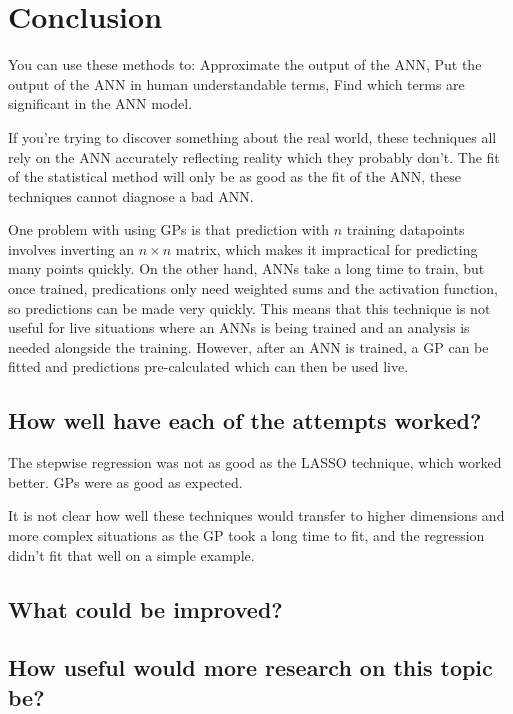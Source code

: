 
\chapter{Conclusion}

You can use these methods to:
Approximate the output of the \ac{ANN},
Put the output of the \ac{ANN} in human understandable terms,
Find which terms are significant in the \ac{ANN} model.

If you're trying to discover something about the real world, these techniques all rely on the \ac{ANN} accurately reflecting reality which they probably don't.
The fit of the statistical method will only be as good as the fit of the ANN, these techniques cannot diagnose a bad \ac{ANN}.

One problem with using \acp{GP} is that prediction with \(n\) training datapoints involves inverting an \(n \times n\) matrix, which makes it impractical for predicting many points quickly.
On the other hand, \acp{ANN} take a long time to train, but once trained, predications only need weighted sums and the activation function, so predictions can be made very quickly.
This means that this technique is not useful for live situations where an \acp{ANN} is being trained and an analysis is needed alongside the training.
However, after an \ac{ANN} is trained, a \ac{GP} can be fitted and predictions pre-calculated which can then be used live.

\section{How well have each of the attempts worked?}

The stepwise regression was not as good as the \ac{LASSO} technique, which worked better.
\acp{GP} were as good as expected.

It is not clear how well these techniques would transfer to higher dimensions and more complex situations as the \ac{GP} took a long time to fit, and the regression didn't fit that well on a simple example.

\section{What could be improved?}

\section{How useful would more research on this topic be?}

